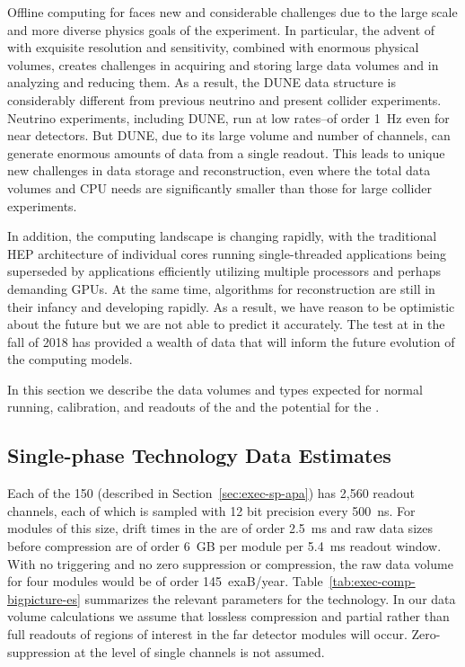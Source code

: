 Offline computing for   faces new and considerable challenges due to the large scale and more diverse physics goals of the experiment.  In particular, the advent of  with exquisite resolution and sensitivity, combined with enormous physical volumes, creates challenges in acquiring and storing large data volumes and in analyzing and reducing them.  
As a result, the DUNE data structure is considerably different from previous neutrino and present collider experiments.  Neutrino experiments, including DUNE, run at low rates--of order \SI{1}{Hz} even for near detectors. But DUNE, due to its large volume and number of channels, can generate enormous amounts of data from a single readout.
This leads to unique new challenges in data storage and reconstruction, even where the total data volumes and CPU needs are significantly smaller than those for large collider experiments.  

In addition, the computing landscape is changing rapidly, with the traditional HEP architecture of individual cores running single-threaded applications being superseded by applications efficiently utilizing multiple processors and perhaps demanding GPUs. At the same time, algorithms for  reconstruction are still in their infancy and developing rapidly.  As a result, we have reason to be optimistic about the future but we are not able to predict it accurately.  The  test at  in the fall of 2018 has provided a wealth of data that will inform the future evolution of  the  computing models.

In this section we describe the data volumes and types expected for normal running, calibration, and  readouts of the  and the potential for the . 


\subsection{Single-phase Technology Data Estimates}

 
Each of the 150   (described in  Section~\ref{sec:exec-sp-apa}) has 2,560 readout channels, each of which %
is sampled with 12 bit precision every \SI{500}{ns}. 
For modules of this size, drift times in the  are of order \SI{2.5}{ms} and raw data sizes before compression are of order \SI{6}{GB} per module per \SI{5.4}{ms} readout window.  With no triggering and no zero suppression or compression, the raw data volume for four modules would be of order \SI{145}{exaB/year}. Table~\ref{tab:exec-comp-bigpicture-es} summarizes the relevant parameters for the  technology.  In our data volume calculations we assume that lossless compression and partial rather than full readouts of regions of interest in the far detector modules will occur.  Zero-suppression at the level of single channels is not assumed. 


